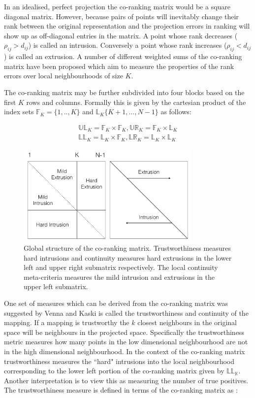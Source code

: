 In an idealised, perfect projection the co-ranking matrix would be a square diagonal matrix. However, because pairs of points will inevitably change their rank between the original representation and the projection errors in ranking will show up as off-diagonal entries in the matrix. A point whose rank decreases ($\rho_{ij} > d_{ij}$)  is called an intrusion. Conversely a point whose rank increases ($\rho_{ij} < d_{ij}$) is called an extrusion. A number of different weighted sums of the co-ranking matrix have been proposed which aim to measure the properties of the rank errors over local neighbourhoods of size $K$.

The co-ranking matrix may be further subdivided into four blocks based on the first $K$ rows and columns. Formally this is given by the cartesian product of the index sets $\mathbb{F}_K = \{1, .., K\}$ and $\mathbb{L}_K \{K+1, ..., N-1\}$ as follows:

\begin{align}
	\mathbb{UL}_K = \mathbb{F}_K \times \mathbb{F}_K,  \mathbb{UR}_K = \mathbb{F}_K \times \mathbb{L}_K
	\\
	\mathbb{LL}_K = \mathbb{L}_K \times \mathbb{F}_K,  \mathbb{LR}_K = \mathbb{L}_K \times \mathbb{L}_K
\end{align}

\begin{figure}
	\label{fig:co-ranking-matrix}
	\centering
	\includegraphics[width=0.8\textwidth]{Images/co-ranking.png}	
	\caption{Global structure of the co-ranking matrix. Trustworthiness measures hard intrusions and continuity measures hard extrusions in the lower left and upper right submatrix respectively. The local continuity meta-criteria measures the mild intrusion and extrusions in the upper left submatrix.}
\end{figure}


One set of measures which can be derived from the co-ranking matrix was suggested by Venna and Kaski \cite{kaski2003trustworthiness} is called the trustworthiness and continuity of the mapping. If a mapping is trustworthy the $k$ closest neighbours in the original space will be neighbours in the projected space. Specifically the trustworthiness metric measures how many points in the low dimensional neighbourhood are not in the high dimensional neighbourhood. In the context of the co-ranking matrix trustworthiness measures the ``hard" intrusions into the local neighbourhood corresponding to the lower left portion of the co-ranking matrix given by $\mathbb{LL_K}$. Another interpretation is to view this as measuring the number of true positives. The trustworthiness measure is defined in terms of the co-ranking matrix as \cite{lee2009quality}:

